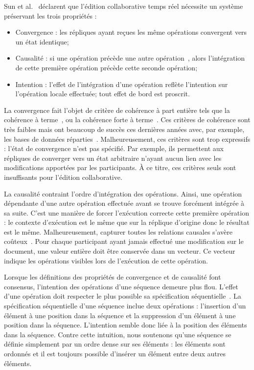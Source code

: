 Sun et al.~\cite{sun1998achieving} déclarent que l'édition collaborative temps
réel nécessite un système préservant les trois propriétés :
\begin{itemize}
\item Convergence : les répliques ayant reçues les même opérations convergent
  vers un état identique;
\item Causalité : si une opération précède une autre
  opération~\cite{lamport1978time}, alors l'intégration de cette première
  opération précède cette seconde opération;
\item Intention : l'effet de l'intégration d'une opération reflète l'intention
  sur l'opération locale effectuée; tout effet de bord est proscrit.
\end{itemize}

\noindent La convergence fait l'objet de critère de cohérence à part entière
tels que la cohérence à terme~\cite{bailis2013eventual}, ou la cohérence forte à
terme~\cite{shapiro2011conflict}. Ces critères de cohérence sont très faibles
mais ont beaucoup de succès ces dernières années avec, par exemple, les bases de
données réparties~\cite{dynamo, riak, cassandra, mongodb}. Malheureusement, ces
critères sont trop expressifs : l'état de convergence n'est pas spécifié. Par
exemple, ils permettent aux répliques de converger vers un état arbitraire
n'ayant aucun lien avec les modifications apportées par les participants. À ce
titre, ces critères seuls sont insuffisants pour l'édition collaborative.

\noindent La causalité contraint l'ordre d'intégration des opérations. Ainsi,
une opération dépendante d'une autre opération effectuée avant se trouve
forcément intégrée à sa suite. C'est une manière de forcer l'exécution correcte
cette première opération : le contexte d'exécution est le même que sur la
réplique d'origine donc le résultat est le même.  Malheureusement, capturer
toutes les relations causales s'avère
coûteux~\cite{charronbost1991concerning}. Pour chaque participant ayant jamais
effectué une modification sur le document, une valeur entière doit être
conservée dans un vecteur. Ce vecteur indique les opérations visibles lors de
l'exécution de cette opération.

\noindent Lorsque les définitions des propriétés de convergence et de causalité
font consensus, l'intention des opérations d'une séquence demeure plus
flou. L'effet d'une opération doit respecter le plus possible sa spécification
séquentielle~\cite{bieniusa2012brief}. La spécification séquentielle d'une
séquence inclue deux opérations : l'insertion d'un élément à une position dans
la séquence et la suppression d'un élément à une position dans la
séquence. L'intention semble donc liée à la position des éléments dans la
séquence. Contre cette intuition, nous soutenons qu'une séquence se définie
simplement par un ordre dense sur ses éléments : les éléments sont ordonnés et
il est toujours possible d'insérer un élément entre deux autres éléments.

